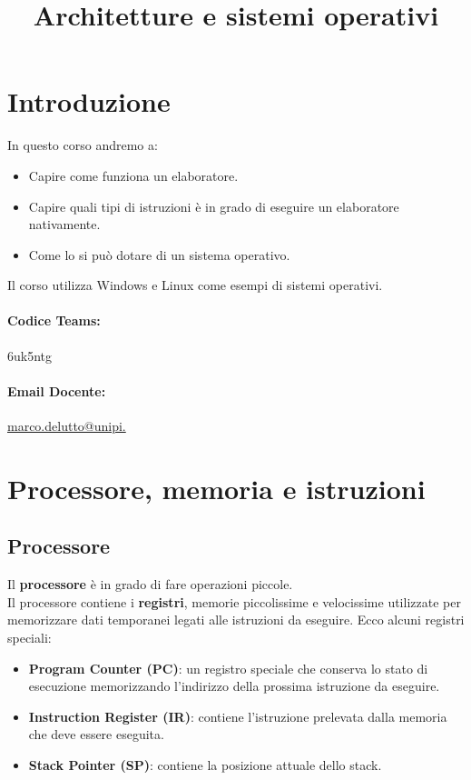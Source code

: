 \documentclass[12pt,a4paper]{article}
\title{Architetture e sistemi operativi}
\author{}
\date{}
\let\oldsection\section
\renewcommand{\section}{\clearpage\oldsection}
\begin{document}
\maketitle
\tableofcontents

\section{Introduzione}
In questo corso andremo a:
\begin{itemize}
    \item Capire come funziona un elaboratore.
    \item Capire quali tipi di istruzioni è in grado di eseguire un elaboratore nativamente.
    \item Come lo si può dotare di un sistema operativo.
\end{itemize}
Il corso utilizza Windows e Linux come esempi di sistemi operativi.
\paragraph{Codice Teams:} 6uk5ntg
\paragraph{Email Docente:} \href{marco.delutto@unipi.}{marco.delutto@unipi.}

\section{Processore, memoria e istruzioni}
\subsection{Processore}
Il \textbf{processore} è in grado di fare operazioni piccole.\\
Il processore contiene i \textbf{registri}, memorie piccolissime e velocissime utilizzate per memorizzare dati temporanei legati alle istruzioni da eseguire.
Ecco alcuni registri speciali:
\begin{itemize}
    \item \textbf{Program Counter (PC)}: un registro speciale che conserva lo stato di esecuzione memorizzando l'indirizzo della prossima istruzione da eseguire.
    \item \textbf{Instruction Register (IR)}: contiene l'istruzione prelevata dalla memoria che deve essere eseguita.
    \item \textbf{Stack Pointer (SP)}: contiene la posizione attuale dello stack.
\end{itemize}
\end{document}
